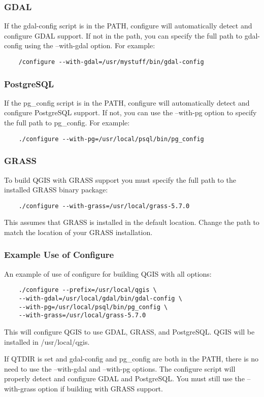   \subsubsection{GDAL}
  If the gdal-config script is in the PATH, configure will automatically
  detect and configure GDAL support. If not in the path, you can specify
  the full path to gdal-config using the --with-gdal option. For example:
  \begin{verbatim}
    /configure --with-gdal=/usr/mystuff/bin/gdal-config
  \end{verbatim}
  \subsubsection{PostgreSQL}
  If the pg\_config script is in the PATH, configure will automatically
  detect and configure PostgreSQL support. If not, you can use the
  --with-pg option to specify the full path to pg\_config. For example:
  \begin{verbatim}
    ./configure --with-pg=/usr/local/psql/bin/pg_config
  \end{verbatim}
\subsubsection{GRASS}
To build QGIS with GRASS support you must specify the full path to the installed GRASS binary package:
\begin{verbatim}
    ./configure --with-grass=/usr/local/grass-5.7.0
\end{verbatim}
This assumes that GRASS is installed in the default location. Change the path to match the location of your GRASS installation.
  \subsubsection{Example Use of Configure}
  An example of use of configure for building QGIS with all options:
  \begin{verbatim}
    ./configure --prefix=/usr/local/qgis \
    --with-gdal=/usr/local/gdal/bin/gdal-config \
    --with-pg=/usr/local/psql/bin/pg_config \
    --with-grass=/usr/local/grass-5.7.0
  \end{verbatim}
  This will configure QGIS to use GDAL, GRASS, and PostgreSQL. QGIS will be
  installed in /usr/local/qgis.

  If QTDIR is set and gdal-config and pg\_config are both
  in the PATH, there is no need to use the --with-gdal and --with-pg
  options. The configure script will properly detect and configure
  GDAL and PostgreSQL. You must still use the --with-grass option if building with GRASS support.

